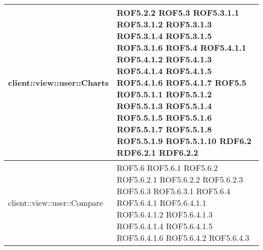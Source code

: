\begin{center}
\begin{longtable}{| p{11cm} | p{2.5cm} |}
client::view::user::Charts & ROF5.2.2 \newline ROF5.3 \newline ROF5.3.1.1 \newline ROF5.3.1.2 \newline ROF5.3.1.3 \newline ROF5.3.1.4 \newline ROF5.3.1.5 \newline ROF5.3.1.6 \newline ROF5.4 \newline ROF5.4.1.1 \newline ROF5.4.1.2 \newline ROF5.4.1.3 \newline ROF5.4.1.4 \newline ROF5.4.1.5 \newline ROF5.4.1.6 \newline ROF5.4.1.7 \newline ROF5.5 \newline ROF5.5.1.1 \newline ROF5.5.1.2 \newline ROF5.5.1.3 \newline ROF5.5.1.4 \newline ROF5.5.1.5 \newline ROF5.5.1.6 \newline ROF5.5.1.7 \newline ROF5.5.1.8 \newline ROF5.5.1.9 \newline ROF5.5.1.10 \newline RDF6.2 \newline RDF6.2.1 \newline RDF6.2.2 \\
\hline
client::view::user::Compare & ROF5.6 \newline ROF5.6.1 \newline ROF5.6.2 \newline ROF5.6.2.1 \newline ROF5.6.2.2 \newline ROF5.6.2.3 \newline ROF5.6.3 \newline ROF5.6.3.1 \newline ROF5.6.4 \newline ROF5.6.4.1 \newline ROF5.6.4.1.1 \newline ROF5.6.4.1.2 \newline ROF5.6.4.1.3 \newline ROF5.6.4.1.4 \newline ROF5.6.4.1.5 \newline ROF5.6.4.1.6 \newline ROF5.6.4.2 \newline ROF5.6.4.3 \\

\end{longtable}
\end{center}
